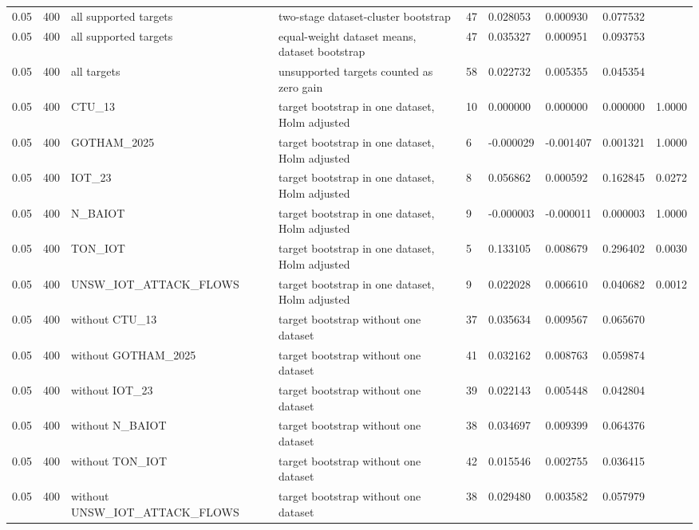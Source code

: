 \begin{tabular}{lllllllll}
0.05 & 400 & all supported targets & two-stage dataset-cluster bootstrap & 47 & 0.028053 & 0.000930 & 0.077532 &  \\
0.05 & 400 & all supported targets & equal-weight dataset means, dataset bootstrap & 47 & 0.035327 & 0.000951 & 0.093753 &  \\
0.05 & 400 & all targets & unsupported targets counted as zero gain & 58 & 0.022732 & 0.005355 & 0.045354 &  \\
0.05 & 400 & CTU\_13 & target bootstrap in one dataset, Holm adjusted & 10 & 0.000000 & 0.000000 & 0.000000 & 1.0000 \\
0.05 & 400 & GOTHAM\_2025 & target bootstrap in one dataset, Holm adjusted & 6 & -0.000029 & -0.001407 & 0.001321 & 1.0000 \\
0.05 & 400 & IOT\_23 & target bootstrap in one dataset, Holm adjusted & 8 & 0.056862 & 0.000592 & 0.162845 & 0.0272 \\
0.05 & 400 & N\_BAIOT & target bootstrap in one dataset, Holm adjusted & 9 & -0.000003 & -0.000011 & 0.000003 & 1.0000 \\
0.05 & 400 & TON\_IOT & target bootstrap in one dataset, Holm adjusted & 5 & 0.133105 & 0.008679 & 0.296402 & 0.0030 \\
0.05 & 400 & UNSW\_IOT\_ATTACK\_FLOWS & target bootstrap in one dataset, Holm adjusted & 9 & 0.022028 & 0.006610 & 0.040682 & 0.0012 \\
0.05 & 400 & without CTU\_13 & target bootstrap without one dataset & 37 & 0.035634 & 0.009567 & 0.065670 &  \\
0.05 & 400 & without GOTHAM\_2025 & target bootstrap without one dataset & 41 & 0.032162 & 0.008763 & 0.059874 &  \\
0.05 & 400 & without IOT\_23 & target bootstrap without one dataset & 39 & 0.022143 & 0.005448 & 0.042804 &  \\
0.05 & 400 & without N\_BAIOT & target bootstrap without one dataset & 38 & 0.034697 & 0.009399 & 0.064376 &  \\
0.05 & 400 & without TON\_IOT & target bootstrap without one dataset & 42 & 0.015546 & 0.002755 & 0.036415 &  \\
0.05 & 400 & without UNSW\_IOT\_ATTACK\_FLOWS & target bootstrap without one dataset & 38 & 0.029480 & 0.003582 & 0.057979 &  \\
\bottomrule
\end{tabular}
